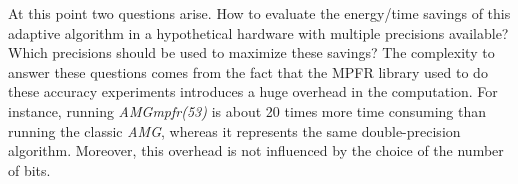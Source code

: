  At this point two
questions arise. How to evaluate the energy/time savings of this adaptive
algorithm in a hypothetical hardware with multiple precisions available? Which
precisions should be used to maximize these savings? The complexity to answer
these questions comes from the fact that the MPFR library used to do these
accuracy experiments introduces a huge overhead in the computation. For
instance, running \emph{AMGmpfr(53)} is about 20 times more time consuming than
running the classic \emph{AMG}, whereas it represents the same double-precision
algorithm.  Moreover, this overhead is not influenced by the choice of the
number of bits.  



